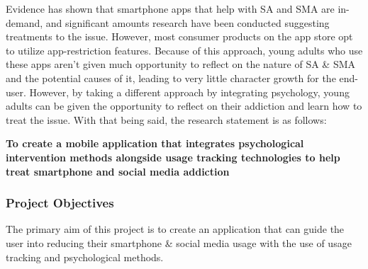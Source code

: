 \documentclass[12pt]{article}
\begin{document}

Evidence has shown that smartphone apps that help with SA and SMA are 
in-demand, and significant amounts research have been conducted suggesting treatments to the 
issue. However, most consumer products on the app store opt to utilize app-restriction features. Because of 
this approach, young adults who use these apps aren't given much opportunity to reflect on the nature of SA \& SMA 
and the potential causes of it, leading to very little character growth for the end-user. However, by taking a 
different approach by integrating psychology, young adults can be given the opportunity to reflect on their 
addiction and learn how to treat the issue. With that being said, the research statement is as follows: \newline

\noindent\textbf{To create a mobile application that integrates psychological intervention methods alongside usage 
tracking technologies to help treat smartphone and social media addiction}


\subsubsection{Project Objectives}
The primary aim of this project is to create an application that can guide the user into reducing their smartphone 
\& social media usage with the use of usage tracking and psychological methods.\newline
\end{document}
